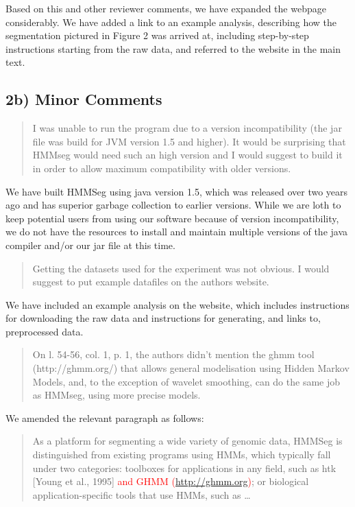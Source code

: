 \documentclass{article}
\newcommand{\breview}{\begin{quotation}\begin{em}\noindent}
\newcommand{\ereview}{\end{em}\end{quotation}}
\begin{document}
Based on this and other reviewer comments, we have expanded the
webpage considerably.  We have added a link to an example analysis,
describing how the segmentation pictured in Figure 2 was arrived at,
including step-by-step instructions starting from the raw data, and
referred to the website in the main text. 

\subsection*{2b) Minor Comments}

\breview I was unable to run the program due to a version
incompatibility (the jar file was build for JVM version 1.5 and
higher). It would be surprising that HMMseg would need such an high
version and I would suggest to build it in order to allow maximum
compatibility with older versions.  \ereview

We have built HMMSeg using java version 1.5, which was released over
two years ago and has superior garbage collection to earlier versions.
While we are loth to keep potential users from using our software
because of version incompatibility, we do not have the resources to
install and maintain multiple versions of the java compiler and/or our
jar file at this time.

\breview
Getting the datasets used for the experiment was not obvious. I would
suggest to put example datafiles on the authors website.
\ereview

We have included an example analysis on the website, which includes
instructions for downloading the raw data and instructions for
generating, and links to, preprocessed data.

\breview
On l. 54-56, col. 1, p. 1, the authors didn't mention the ghmm tool
(http://ghmm.org/) that allows general modelisation using Hidden
Markov Models, and, to the exception of wavelet smoothing, can do the
same job as HMMseg, using more precise models.
\ereview

We amended the relevant paragraph as follows:

\begin{quotation}
As a platform for segmenting a wide variety of genomic data, HMMSeg is
distinguished from existing programs using HMMs, which typically fall
under two categories: toolboxes for applications in any field, such as
htk [Young et al., 1995] \textcolor{red}{and GHMM
(\url{http://ghmm.org})}; or biological application-specific tools
that use HMMs, such as \ldots
\end{quotation}
\end{document}
